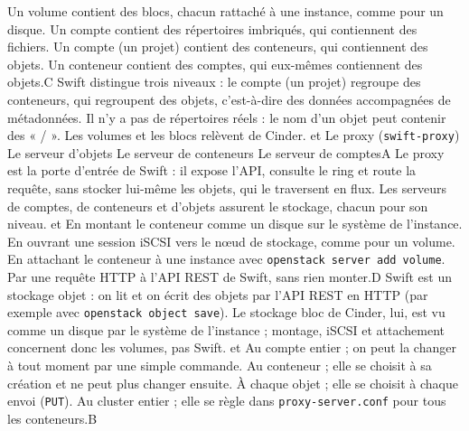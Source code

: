   {Un volume contient des blocs, chacun rattaché à une instance, comme pour un disque.}
  {Un compte contient des répertoires imbriqués, qui contiennent des fichiers.}
  {Un compte (un projet) contient des conteneurs, qui contiennent des objets.}
  {Un conteneur contient des comptes, qui eux-mêmes contiennent des objets.}{C}
  {Swift distingue trois niveaux : le compte (un projet) regroupe des conteneurs, qui regroupent des objets, c'est-à-dire des données accompagnées de métadonnées. Il n'y a pas de répertoires réels : le nom d'un objet peut contenir des « / ». Les volumes et les blocs relèvent de Cinder.}
  { et }
  {Le proxy (\texttt{swift-proxy})}
  {Le serveur d'objets}
  {Le serveur de conteneurs}
  {Le serveur de comptes}{A}
  {Le proxy est la porte d'entrée de Swift : il expose l'API, consulte le ring et route la requête, sans stocker lui-même les objets, qui le traversent en flux. Les serveurs de comptes, de conteneurs et d'objets assurent le stockage, chacun pour son niveau.}
  { et }
  {En montant le conteneur comme un disque sur le système de l'instance.}
  {En ouvrant une session iSCSI vers le nœud de stockage, comme pour un volume.}
  {En attachant le conteneur à une instance avec \texttt{openstack server add volume}.}
  {Par une requête HTTP à l'API REST de Swift, sans rien monter.}{D}
  {Swift est un stockage objet : on lit et on écrit des objets par l'API REST en HTTP (par exemple avec \texttt{openstack object save}). Le stockage bloc de Cinder, lui, est vu comme un disque par le système de l'instance ; montage, iSCSI et attachement concernent donc les volumes, pas Swift.}
  { et }
  {Au compte entier ; on peut la changer à tout moment par une simple commande.}
  {Au conteneur ; elle se choisit à sa création et ne peut plus changer ensuite.}
  {À chaque objet ; elle se choisit à chaque envoi (\texttt{PUT}).}
  {Au cluster entier ; elle se règle dans \texttt{proxy-server.conf} pour tous les conteneurs.}{B}
